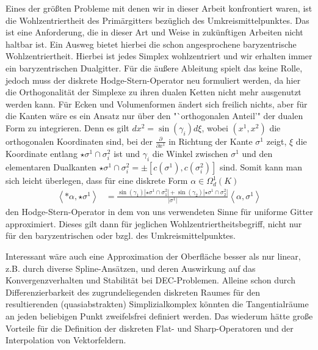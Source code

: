 Eines der größten Probleme mit denen wir in dieser Arbeit konfrontiert waren, ist die Wohlzentriertheit des Primärgitters bezüglich des
Umkreismittelpunktes. 
Das ist eine Anforderung, die in dieser Art und Weise in zukünftigen Arbeiten nicht haltbar ist.
Ein Ausweg bietet hierbei die schon angesprochene baryzentrische Wohlzentriertheit.
Hierbei ist jedes Simplex wohlzentriert und wir erhalten immer ein baryzentrischen Dualgitter.
Für die äußere Ableitung spielt das keine Rolle, jedoch muss der diskrete Hodge-Stern-Operator neu formuliert werden, da hier die
Orthogonalität der Simplexe zu ihren dualen Ketten nicht mehr ausgenutzt werden kann. 
Für Ecken und Volumenformen ändert sich freilich nichts, aber für die Kanten wäre es ein Ansatz nur über den "`orthogonalen Anteil'" der dualen
Form zu integrieren.
Denn es gilt \( dx^{2}= \sin\left( \gamma_{i} \right) d\xi \), 
wobei \( \left( x^{1},x^{2} \right) \) die orthogonalen Koordinaten sind,
bei der \( \frac{\partial}{\partial x^{1}} \) in Richtung der Kante \( \sigma^{1} \) zeigt,
\( \xi \) die Koordinate entlang \( \star\sigma^{1}\cap\sigma^{2}_{i} \) ist
und \( \gamma_{i} \) die Winkel zwischen \( \sigma^{1} \) und den elementaren Dualkanten
\( \star\sigma^{1}\cap\sigma^{2}_{i} = \pm \left[ c(\sigma^{1}),c(\sigma^{2}_{i})  \right] \) sind.
Somit kann man sich leicht überlegen, dass für eine diskrete Form \( \alpha\in\Omega^{1}_{d}(K) \)
\begin{align}
  \left\langle *\alpha, \star\sigma^{1} \right\rangle
      &= \frac{\sin\left( \gamma_{1} \right)\left| \star\sigma^{1}\cap\sigma^{2}_{1} \right|
              +\sin\left( \gamma_{2} \right)\left| \star\sigma^{1}\cap\sigma^{2}_{2} \right| }
              {\left| \sigma^{1} \right|}
           \left\langle \alpha,\sigma^{1} \right\rangle
\end{align}
den Hodge-Stern-Operator in dem von uns verwendeten Sinne für uniforme Gitter approximiert.
Dieses gilt dann für jeglichen Wohlzentriertheitsbegriff, nicht nur für den baryzentrischen oder bzgl. des Umkreismittelpunktes.

Interessant wäre auch eine Approximation der Oberfläche besser als nur linear, z.B. durch diverse Spline-Ansätzen, und deren Auswirkung auf das Konvergenzverhalten und
Stabilität bei DEC-Problemen. 
Alleine schon durch Differenzierbarkeit des zugrundeliegenden diskreten Raumes für den resultierenden (quasiabstrakten) Simplizialkomplex
könnten die Tangentialräume an jeden beliebigen Punkt zweifelsfrei definiert werden.
Das wiederum hätte große Vorteile für die Definition der diskreten Flat- und Sharp-Operatoren und der Interpolation von Vektorfeldern.

